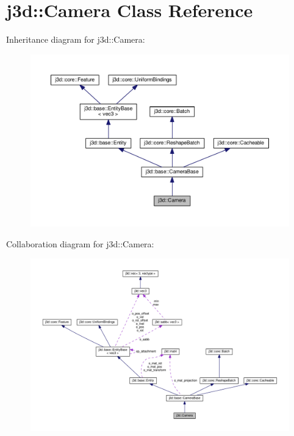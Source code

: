 \hypertarget{classj3d_1_1Camera}{}\section{j3d\+:\+:Camera Class Reference}
\label{classj3d_1_1Camera}


Inheritance diagram for j3d\+:\+:Camera\+:
\nopagebreak
\begin{figure}[H]
\begin{center}
\leavevmode
\includegraphics[width=350pt]{classj3d_1_1Camera__inherit__graph}
\end{center}
\end{figure}


Collaboration diagram for j3d\+:\+:Camera\+:
\nopagebreak
\begin{figure}[H]
\begin{center}
\leavevmode
\includegraphics[width=350pt]{classj3d_1_1Camera__coll__graph}
\end{center}
\end{figure}
